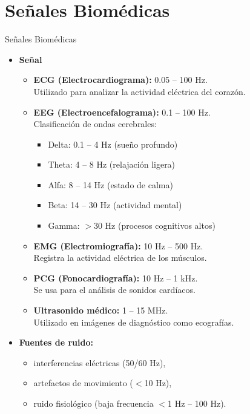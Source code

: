 \documentclass{beamer}
\numberwithin{section}{part}
\begin{document}
\section{Señales Biomédicas}
\begin{frame}{Señales Biomédicas}
    \begin{itemize}
        \item \textbf{Señal}
        \begin{itemize}\scriptsize
            \item \textbf{ECG (Electrocardiograma):} 0.05 – 100 Hz.\\Utilizado para analizar la actividad eléctrica del corazón.
            \item \textbf{EEG (Electroencefalograma):} 0.1 – 100 Hz.\\Clasificación de ondas cerebrales:
            \begin{itemize}\scriptsize
                \item Delta: 0.1 – 4 Hz (sueño profundo)
                \item Theta: 4 – 8 Hz (relajación ligera)
                \item Alfa: 8 – 14 Hz (estado de calma)
                \item Beta: 14 – 30 Hz (actividad mental)
                \item Gamma: $>$30 Hz (procesos cognitivos altos)
            \end{itemize}
            \item \textbf{EMG (Electromiografía):} 10 Hz – 500 Hz.\\Registra la actividad eléctrica de los músculos.
            \item \textbf{PCG (Fonocardiografía):} 10 Hz – 1 kHz.\\Se usa para el análisis de sonidos cardíacos.
            \item \textbf{Ultrasonido médico:} 1 – 15 MHz.\\Utilizado en imágenes de diagnóstico como ecografías.
        \end{itemize}
        \item \textbf{Fuentes de ruido:}
        \begin{itemize}\scriptsize
            \item interferencias eléctricas (50/60 Hz),
            \item artefactos de movimiento ($<$10 Hz),
            \item ruido fisiológico (baja frecuencia $<$1 Hz – 100 Hz).
        \end{itemize}
    \end{itemize}
\end{frame}
\end{document}
